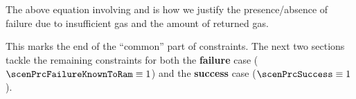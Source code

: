 	\saNote{} The above equation involving \scenPrcFailure{} and \locPrcReturnGas{} is how we justify the presence/absence of failure due to insufficient gas and the amount of returned gas.

	This marks the end of the ``common'' part of constraints.
	The next two sections tackle the remaining constraints for both the
	\textbf{failure} case ($\scenPrcFailureKnownToRam \equiv 1$) and the
	\textbf{success} case ($\scenPrcSuccess \equiv 1$).
